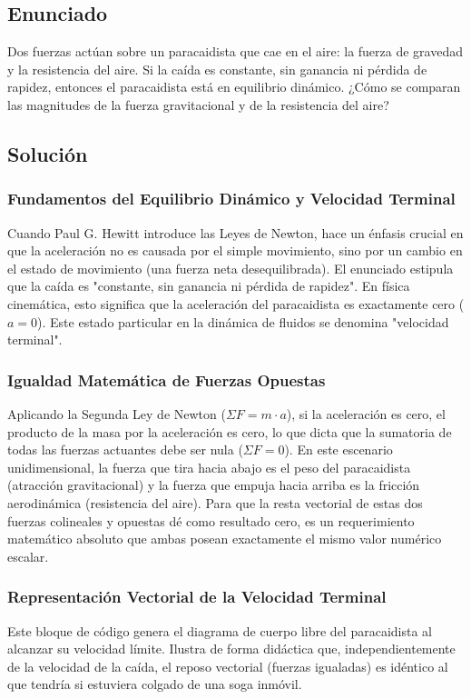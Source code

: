 \documentclass[12pt,letterpaper]{article}
\begin{document}
\newpage

\subsection*{Enunciado}
Dos fuerzas actúan sobre un paracaidista que cae en el aire: la fuerza de gravedad y la resistencia del aire. Si la caída es constante, sin ganancia ni pérdida de rapidez, entonces el paracaidista está en equilibrio dinámico. ¿Cómo se comparan las magnitudes de la fuerza gravitacional y de la resistencia del aire?

\subsection*{Solución}

\subsubsection*{Fundamentos del Equilibrio Dinámico y Velocidad Terminal}
Cuando Paul G. Hewitt introduce las Leyes de Newton, hace un énfasis crucial en que la aceleración no es causada por el simple movimiento, sino por un cambio en el estado de movimiento (una fuerza neta desequilibrada). El enunciado estipula que la caída es "constante, sin ganancia ni pérdida de rapidez". En física cinemática, esto significa que la aceleración del paracaidista es exactamente cero ($a = 0$). Este estado particular en la dinámica de fluidos se denomina "velocidad terminal".

\subsubsection*{Igualdad Matemática de Fuerzas Opuestas}
Aplicando la Segunda Ley de Newton ($\Sigma F = m \cdot a$), si la aceleración es cero, el producto de la masa por la aceleración es cero, lo que dicta que la sumatoria de todas las fuerzas actuantes debe ser nula ($\Sigma F = 0$). 
En este escenario unidimensional, la fuerza que tira hacia abajo es el peso del paracaidista (atracción gravitacional) y la fuerza que empuja hacia arriba es la fricción aerodinámica (resistencia del aire). Para que la resta vectorial de estas dos fuerzas colineales y opuestas dé como resultado cero, es un requerimiento matemático absoluto que ambas posean exactamente el mismo valor numérico escalar.

\subsubsection*{Representación Vectorial de la Velocidad Terminal}
Este bloque de código genera el diagrama de cuerpo libre del paracaidista al alcanzar su velocidad límite. Ilustra de forma didáctica que, independientemente de la velocidad de la caída, el reposo vectorial (fuerzas igualadas) es idéntico al que tendría si estuviera colgado de una soga inmóvil.
\end{document}
